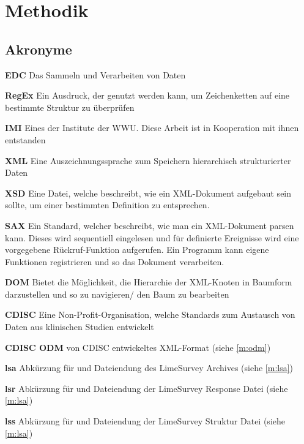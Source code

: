 \chapter{Methodik}
\label{ch:methodik}

\section{Akronyme}

\begin{description}[font=\sffamily\bfseries, leftmargin=0cm, itemsep=-0.15cm, style=nextline]
	\item \textbf{EDC}  Das Sammeln und Verarbeiten von Daten
	\item \textbf{RegEx}  Ein Ausdruck, der genutzt werden kann, um Zeichenketten auf eine bestimmte Struktur zu überprüfen
	\item \textbf{IMI}  Eines der Institute der WWU. Diese Arbeit ist in Kooperation mit ihnen entstanden
	\item \textbf{XML}  Eine Auszeichnungssprache zum Speichern hierarchisch strukturierter Daten 
	\item \textbf{XSD}  Eine Datei, welche beschreibt, wie ein XML-Dokument aufgebaut sein sollte, um einer bestimmten Definition zu entsprechen.
	\item \textbf{SAX}  Ein Standard, welcher beschreibt, wie man ein XML-Dokument parsen kann. Dieses wird sequentiell eingelesen und für definierte Ereignisse wird eine vorgegebene Rückruf-Funktion aufgerufen. Ein Programm kann eigene Funktionen registrieren und so das Dokument verarbeiten.
	\item \textbf{DOM}  Bietet die Möglichkeit, die Hierarchie der XML-Knoten in Baumform darzustellen und so zu navigieren/ den Baum zu bearbeiten
	\item \textbf{CDISC}  Eine Non-Profit-Organisation, welche Standards zum Austausch von Daten aus klinischen Studien entwickelt
	\item \textbf{CDISC ODM}  von CDISC entwickeltes XML-Format (siehe \cref{m:odm})
	\item \textbf{lsa} Abkürzung für und Dateiendung des LimeSurvey Archives (siehe \cref{m:lsa})
	\item \textbf{lsr} Abkürzung für und Dateiendung der LimeSurvey Response Datei (siehe \cref{m:lsa})
	\item \textbf{lss} Abkürzung für und Dateiendung der LimeSurvey Struktur Datei (siehe \cref{m:lsa})
\end{description}


